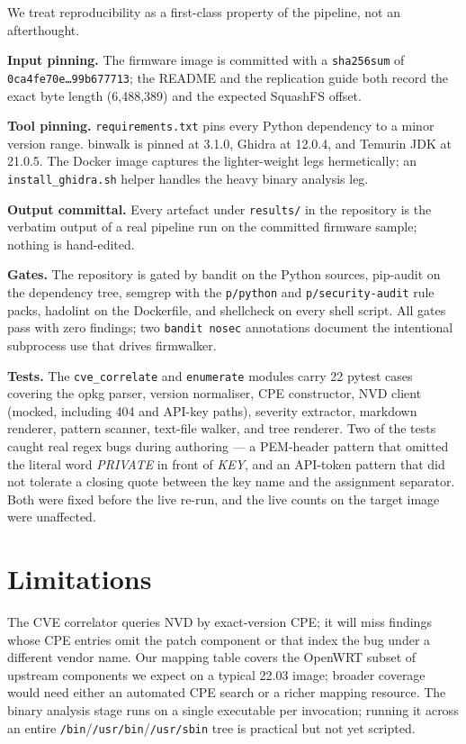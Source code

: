 \documentclass[conference]{IEEEtran}
\begin{document}
We treat reproducibility as a first-class property of the
pipeline, not an afterthought.

\textbf{Input pinning.} The firmware image is committed with a
\texttt{sha256sum} of
\texttt{0ca4fe70e\dots99b677713}; the README and the replication
guide both record the exact byte length (6{,}488{,}389) and the
expected SquashFS offset.

\textbf{Tool pinning.} \texttt{requirements.txt} pins every Python
dependency to a minor version range. binwalk is pinned at 3.1.0,
Ghidra at 12.0.4, and Temurin JDK at 21.0.5. The Docker image
captures the lighter-weight legs hermetically; an
\texttt{install\_ghidra.sh} helper handles the heavy binary
analysis leg.

\textbf{Output committal.} Every artefact under \texttt{results/}
in the repository is the verbatim output of a real pipeline run on
the committed firmware sample; nothing is hand-edited.

\textbf{Gates.} The repository is gated by bandit on the Python
sources, pip-audit on the dependency tree, semgrep with the
\texttt{p/python} and \texttt{p/security-audit} rule packs,
hadolint on the Dockerfile, and shellcheck on every shell script.
All gates pass with zero findings; two
\texttt{bandit}~\texttt{nosec} annotations document the
intentional subprocess use that drives firmwalker.

\textbf{Tests.} The \texttt{cve\_correlate} and \texttt{enumerate}
modules carry 22 pytest cases covering the opkg parser, version
normaliser, CPE constructor, NVD client (mocked, including 404 and
API-key paths), severity extractor, markdown renderer, pattern
scanner, text-file walker, and tree renderer. Two of the tests
caught real regex bugs during authoring — a PEM-header pattern
that omitted the literal word \emph{PRIVATE} in front of
\emph{KEY}, and an API-token pattern that did not tolerate a
closing quote between the key name and the assignment separator.
Both were fixed before the live re-run, and the live counts on
the target image were unaffected.

\section{Limitations}

The CVE correlator queries NVD by exact-version CPE; it will miss
findings whose CPE entries omit the patch component or that index
the bug under a different vendor name. Our mapping table covers
the OpenWRT subset of upstream components we expect on a typical
22.03 image; broader coverage would need either an automated CPE
search or a richer mapping resource. The binary analysis stage
runs on a single executable per invocation; running it across an
entire \texttt{/bin}/\texttt{/usr/bin}/\texttt{/usr/sbin} tree is
practical but not yet scripted.
\end{document}
